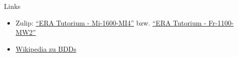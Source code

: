\documentclass[
  german,            %
  aspectratio=169,    %
]{tumbeamer}
\begin{document}
\begin{frame}[fragile, c]{Links}{}
  \begin{itemize}
    \item Zulip: \href{https://zulip.in.tum.de/#narrow/stream/1917-ERA-Tutorium---Mi-1600-MI4}{\enquote{ERA Tutorium - Mi-1600-MI4}}
    bzw. \href{https://zulip.in.tum.de/#narrow/stream/1940-ERA-Tutorium---Fr-1100-MW2}{\enquote{ERA Tutorium - Fr-1100-MW2}}
    \item \href{https://en.wikipedia.org/wiki/Binary_decision_diagram}{Wikipedia zu BDDs}
  \end{itemize}
\end{frame}

\maketitle
\end{document}
